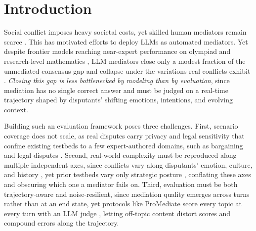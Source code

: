 



\section{Introduction}
\label{sec:introduction}

Social conflict imposes heavy societal costs, yet skilled human mediators remain scarce \citep{tessler2024habermas,ma2025towards}. This has motivated efforts to deploy LLMs as automated mediators. Yet despite frontier models reaching near-expert performance on olympiad and research-level mathematics \citep{dekoninck2026matharena}, LLM mediators close only a modest fraction of the unmediated consensus gap \citep{liu2025promediate} and collapse under the variations real conflicts exhibit \citep{shapira2024clever,wu2026social}. \emph{Closing this gap is less bottlenecked by modeling than by evaluation}, since mediation has no single correct answer and must be judged on a real-time trajectory shaped by disputants' shifting emotions, intentions, and evolving context.

Building such an evaluation framework poses three challenges. First, scenario coverage does not scale, as real disputes carry privacy and legal sensitivity that confine existing testbeds to a few expert-authored domains, such as bargaining \citep{hale2025kodis} and legal disputes \citep{chen2026simulating}. Second, real-world complexity must be reproduced along multiple independent axes, since conflicts vary along disputants' emotion, culture, and history \citep{rakshit2025emotionally,guo2025conflict}, yet prior testbeds vary only strategic posture \citep{liu2025promediate,chen2026simulating}, conflating these axes and obscuring which one a mediator fails on. Third, evaluation must be both trajectory-aware and noise-resilient, since mediation quality emerges across turns rather than at an end state, yet protocols like ProMediate score every topic at every turn with an LLM judge \citep{liu2025promediate}, letting off-topic content distort scores and compound errors along the trajectory.

